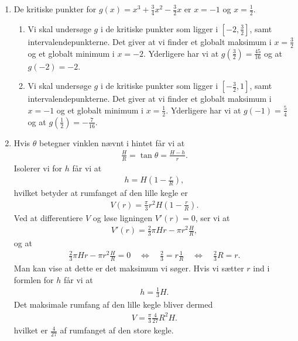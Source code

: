 \begin{enumerate}
%	


	\item De kritiske punkter for $ g(x)=x^3+\frac{3}{4}x^2-\frac{3}{2}x $ er $x=-1$ og $x=\frac{1}{2}$.
	\begin{enumerate}
		\item Vi skal undersøge $g$ i de kritiske punkter som ligger i $ [-2,\frac{3}{2}] $, samt intervalendepunkterne. Det giver at vi finder et globalt maksimum i $x=\frac{3}{2}$ og et globalt minimum i $x=-2$. Yderligere har vi at $g(\frac{3}{2})=\frac{45}{16}$ og at $g(-2)=-2$.
		\item Vi skal undersøge $g$ i de kritiske punkter som ligger i  $ [-\frac{3}{2},1] $, samt intervalendepunkterne. Det giver at vi finder et globalt maksimum i $x=-1$ og et globalt minimum i $x=\frac{1}{2}$. Yderligere har vi at $g(-1)=\frac{5}{4}$ og at $g(\frac{1}{2})=-\frac{7}{16}$.
	\end{enumerate}
 
 	\item \label{it:opt3} Hvis $\theta$ betegner vinklen nævnt i hintet får vi at
 	\begin{align*}
 	\frac{H}{R}=\tan \theta= \frac{H-h}{r}.
 	\end{align*}
 	Isolerer vi for $h$ får vi at
 	\begin{align*}
 	h=H(1-\frac{r}{R}),
 	\end{align*}
 	hvilket betyder at rumfanget af den lille kegle er
 	\begin{align*}
 	V(r)=\frac{\pi}{3} r^2 H(1-\frac{r}{R}).
 	\end{align*}
 	Ved at differentiere $V$ og løse ligningen $V'(r)=0$, ser vi at
 	\begin{align*}
 	V'(r)=\frac{2}{3}\pi Hr-\pi r^2 \frac{H}{R},
 	\end{align*}
 	og at
 	\begin{align*}
	\frac{2}{3}\pi Hr-\pi r^2 \frac{H}{R}=0\quad \Leftrightarrow\quad \frac{2}{3}=r \frac{1}{R}\quad \Leftrightarrow\quad \frac{2}{3}R=r.
 	\end{align*}
 	Man kan vise at dette er det maksimum vi søger. Hvis vi sætter $r$ ind i formlen for $h$ får vi at
 	\begin{align*}
 	h=\frac{1}{3}H.
 	\end{align*}
 	Det maksimale rumfang af den lille kegle bliver dermed
 	\begin{align*}
 	V=\frac{\pi}{3}\frac{4}{27}R^2H.
 	\end{align*}
 	hvilket er $\frac{4}{27}$ af rumfanget af den store kegle.
 	

\end{enumerate}
